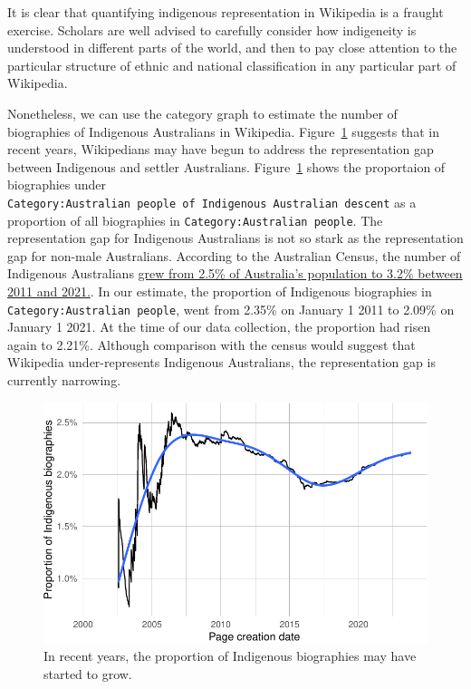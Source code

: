 \documentclass[
  a4paper,
  DIV=11,
  numbers=noendperiod]{scrreprt}
\begin{document}
It is clear that quantifying indigenous representation in Wikipedia is a
fraught exercise. Scholars are well advised to carefully consider how
indigeneity is understood in different parts of the world, and then to
pay close attention to the particular structure of ethnic and national
classification in any particular part of Wikipedia.

Nonetheless, we can use the category graph to estimate the number of
biographies of Indigenous Australians in Wikipedia.
Figure~\ref{fig-indigenous-growth-wikipedia} suggests that in recent
years, Wikipedians may have begun to address the representation gap
between Indigenous and settler Australians.
Figure~\ref{fig-indigenous-growth-wikipedia} shows the proportaion of
biographies under
\texttt{Category:Australian\ people\ of\ Indigenous\ Australian\ descent}
as a proportion of all biographies in
\texttt{Category:Australian\ people}. The representation gap for
Indigenous Australians is not so stark as the representation gap for
non-male Australians. According to the Australian Census, the number of
Indigenous Australians
\href{https://www.abs.gov.au/statistics/people/people-and-communities/snapshot-australia/2021\#aboriginal-and-torres-strait-islander-communities}{grew
from 2.5\% of Australia's population to 3.2\% between 2011 and 2021.}.
In our estimate, the proportion of Indigenous biographies in
\texttt{Category:Australian\ people}, went from 2.35\% on January 1 2011
to 2.09\% on January 1 2021. At the time of our data collection, the
proportion had risen again to 2.21\%. Although comparison with the
census would suggest that Wikipedia under-represents Indigenous
Australians, the representation gap is currently narrowing.

\begin{figure}

{\centering \includegraphics{who-counts_files/figure-pdf/fig-indigenous-growth-wikipedia-1.pdf}

}

\caption{\label{fig-indigenous-growth-wikipedia}In recent years, the
proportion of Indigenous biographies may have started to grow.}

\end{figure}
\end{document}
